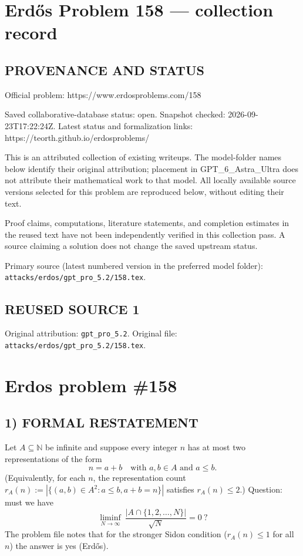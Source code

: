 \section*{Erd\H{o}s Problem 158 --- collection record}

\subsection*{PROVENANCE AND STATUS}
Official problem: https://www.erdosproblems.com/158

Saved collaborative-database status: open.
Snapshot checked: 2026-09-23T17:22:24Z.
Latest status and formalization links: https://teorth.github.io/erdosproblems/

This is an attributed collection of existing writeups. The model-folder names below identify their original attribution; placement in GPT\_6\_Astra\_Ultra does not attribute their mathematical work to that model. All locally available source versions selected for this problem are reproduced below, without editing their text.

Proof claims, computations, literature statements, and completion estimates in the reused text have not been independently verified in this collection pass. A source claiming a solution does not change the saved upstream status.

Primary source (latest numbered version in the preferred model folder): \texttt{attacks/erdos/gpt\_pro\_5.2/158.tex}.

\subsection*{REUSED SOURCE 1}
Original attribution: \texttt{gpt\_pro\_5.2}.
Original file: \texttt{attacks/erdos/gpt\_pro\_5.2/158.tex}.

\section*{Erdos problem \#158}

\subsection*{1) FORMAL RESTATEMENT}
Let $A\subseteq\mathbb N$ be infinite and suppose every integer $n$ has at most two representations of the form
\[
 n=a+b\quad\text{with }a,b\in A\text{ and }a\le b.
\]
(Equivalently, for each $n$, the representation count $r_A(n):=|\{(a,b)\in A^2:a\le b, a+b=n\}|$ satisfies $r_A(n)\le 2$.)
Question: must we have
\[
\liminf_{N\to\infty}\ \frac{|A\cap\{1,2,\dots,N\}|}{\sqrt N}=0\ ?
\]
The problem file notes that for the stronger Sidon condition ($r_A(n)\le 1$ for all $n$) the answer is yes (Erd\H{o}s).

